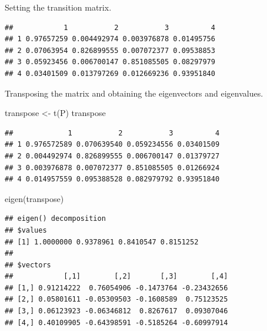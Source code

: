 \documentclass[
]{article}
\newenvironment{Shaded}{\begin{snugshade}}{\end{snugshade}}
\newcommand{\AttributeTok}[1]{\textcolor[rgb]{0.77,0.63,0.00}{#1}}
\newcommand{\FloatTok}[1]{\textcolor[rgb]{0.00,0.00,0.81}{#1}}
\newcommand{\FunctionTok}[1]{\textcolor[rgb]{0.00,0.00,0.00}{#1}}
\newcommand{\NormalTok}[1]{#1}
\newcommand{\OtherTok}[1]{\textcolor[rgb]{0.56,0.35,0.01}{#1}}
\newcommand{\SpecialCharTok}[1]{\textcolor[rgb]{0.00,0.00,0.00}{#1}}
\newcommand{\StringTok}[1]{\textcolor[rgb]{0.31,0.60,0.02}{#1}}
\begin{document}
Setting the transition matrix.

\begin{Shaded}
\end{Shaded}

\begin{verbatim}
##            1           2           3          4
## 1 0.97657259 0.004492974 0.003976878 0.01495756
## 2 0.07063954 0.826899555 0.007072377 0.09538853
## 3 0.05923456 0.006700147 0.851085505 0.08297979
## 4 0.03401509 0.013797269 0.012669236 0.93951840
\end{verbatim}

Transposing the matrix and obtaining the eigenvectors and eigenvalues.

\begin{Shaded}
\begin{Highlighting}[]
\NormalTok{transpose }\OtherTok{\textless{}{-}} \FunctionTok{t}\NormalTok{(P)}
\NormalTok{transpose}
\end{Highlighting}
\end{Shaded}

\begin{verbatim}
##             1           2           3          4
## 1 0.976572589 0.070639540 0.059234556 0.03401509
## 2 0.004492974 0.826899555 0.006700147 0.01379727
## 3 0.003976878 0.007072377 0.851085505 0.01266924
## 4 0.014957559 0.095388528 0.082979792 0.93951840
\end{verbatim}

\begin{Shaded}
\begin{Highlighting}[]
\FunctionTok{eigen}\NormalTok{(transpose)}
\end{Highlighting}
\end{Shaded}

\begin{verbatim}
## eigen() decomposition
## $values
## [1] 1.0000000 0.9378961 0.8410547 0.8151252
## 
## $vectors
##            [,1]        [,2]       [,3]        [,4]
## [1,] 0.91214222  0.76054906 -0.1473764 -0.23432656
## [2,] 0.05801611 -0.05309503 -0.1608589  0.75123525
## [3,] 0.06123923 -0.06346812  0.8267617  0.09307046
## [4,] 0.40109905 -0.64398591 -0.5185264 -0.60997914
\end{verbatim}
\end{document}
